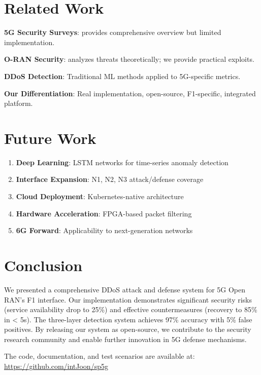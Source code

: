 \documentclass[conference]{IEEEtran}
\begin{document}
\section{Related Work}

\textbf{5G Security Surveys}: \cite{survey-5g-security} provides comprehensive overview but limited implementation.

\textbf{O-RAN Security}: \cite{oran-security-analysis} analyzes threats theoretically; we provide practical exploits.

\textbf{DDoS Detection}: Traditional ML methods \cite{ddos-ml-survey} applied to 5G-specific metrics.

\textbf{Our Differentiation}: Real implementation, open-source, F1-specific, integrated platform.

\section{Future Work}

\begin{enumerate}
    \item \textbf{Deep Learning}: LSTM networks for time-series anomaly detection
    \item \textbf{Interface Expansion}: N1, N2, N3 attack/defense coverage
    \item \textbf{Cloud Deployment}: Kubernetes-native architecture
    \item \textbf{Hardware Acceleration}: FPGA-based packet filtering
    \item \textbf{6G Forward}: Applicability to next-generation networks
\end{enumerate}

\section{Conclusion}

We presented a comprehensive DDoS attack and defense system for 5G Open RAN's F1 interface. Our implementation demonstrates significant security risks (service availability drop to 25\%) and effective countermeasures (recovery to 85\% in < 5s). The three-layer detection system achieves 97\% accuracy with 5\% false positives. By releasing our system as open-source, we contribute to the security research community and enable further innovation in 5G defense mechanisms.

The code, documentation, and test scenarios are available at: \url{https://github.com/intJoon/sp5g}
\end{document}
